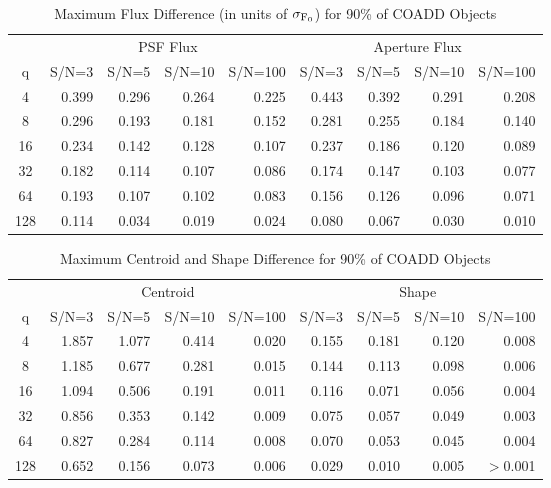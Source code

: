 \begin{table}[ht]
\caption{Maximum Flux Difference (in units of $\sigma_{\rm F_0}$) for 90\% of COADD Objects}
\centering
\begin{tabular}[]{c|rrrr|rrrr}
\hline
     &  \multicolumn{4}{c}{PSF Flux}  & \multicolumn{4}{c}{Aperture Flux} \\
 q   &  S/N=3 & S/N=5 & S/N=10 & S/N=100 & S/N=3 & S/N=5 & S/N=10 & S/N=100  \\
\hline
   4 & 0.399 & 0.296 & 0.264 &  0.225   &  0.443 & 0.392 & 0.291 &  0.208 \\
   8 & 0.296 & 0.193 & 0.181 &  0.152   &  0.281 & 0.255 & 0.184 &  0.140 \\
  16 & 0.234 & 0.142 & 0.128 &  0.107   &  0.237 & 0.186 & 0.120 &  0.089 \\
  32 & 0.182 & 0.114 & 0.107 &  0.086   &  0.174 & 0.147 & 0.103 &  0.077 \\
  64 & 0.193 & 0.107 & 0.102 &  0.083   &  0.156 & 0.126 & 0.096 &  0.071 \\
 128 & 0.114 & 0.034 & 0.019 &  0.024   &  0.080 & 0.067 & 0.030 &  0.010 \\
\hline
\end{tabular}
\label{tab_coadd_flux_diff}
\end{table}



\begin{table}
\caption{Maximum Centroid and Shape Difference for 90\% of COADD Objects}
\centering
\begin{tabular}[]{c|rrrr|rrrr}
\hline
     &  \multicolumn{4}{c}{Centroid}  & \multicolumn{4}{c}{Shape} \\
 q   &  S/N=3 & S/N=5 & S/N=10 & S/N=100 & S/N=3 & S/N=5 & S/N=10 & S/N=100  \\
\hline
   4 & 1.857 & 1.077 & 0.414 &  0.020   &  0.155 & 0.181 & 0.120 &  0.008 \\
   8 & 1.185 & 0.677 & 0.281 &  0.015   &  0.144 & 0.113 & 0.098 &  0.006 \\
  16 & 1.094 & 0.506 & 0.191 &  0.011   &  0.116 & 0.071 & 0.056 &  0.004 \\
  32 & 0.856 & 0.353 & 0.142 &  0.009   &  0.075 & 0.057 & 0.049 &  0.003 \\
  64 & 0.827 & 0.284 & 0.114 &  0.008   &  0.070 & 0.053 & 0.045 &  0.004 \\
 128 & 0.652 & 0.156 & 0.073 &  0.006   &  0.029 & 0.010 & 0.005 &  $>$0.001 \\
\hline
\end{tabular}
\label{tab_coadd_cen_shape_diff}
\end{table}



